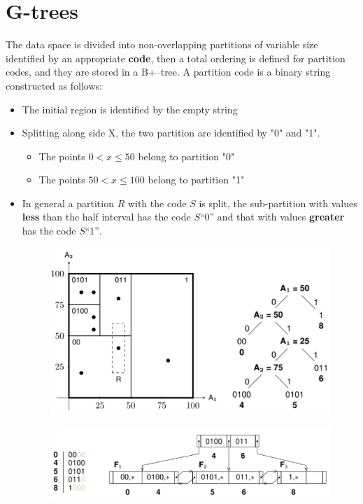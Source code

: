 \section{G-trees}
The data space is divided into non-overlapping partitions of variable size identified by an appropriate \textbf{code}, then a total ordering is defined for partition codes, and they are stored in a B+–tree. A partition code is a binary string constructed as follows:
\begin{itemize}
    \item The initial region is identified by the empty string
    \item Splitting along side X, the two partition are identified by "0" and "1". 
    \begin{itemize}
        \item The points $0 < x \leq 50$ belong to partition "0"
        \item The points $50 < x \leq 100$ belong to partition "1"
    \end{itemize}
    \item In general a partition $R$ with the code $S$ is split, the sub-partition with values \textbf{less} than the half interval has the code $S“0”$ and that with values \textbf{greater} has the code $S“1”$.

    \newpage
    \begin{figure}[h]
         \centering
         \includegraphics[width=.5\linewidth]{images/DBMS_Internals/MultiDimensionalDataOrganizations/G-tree1.jpeg}
    \end{figure}

    \begin{figure}[h]
         \centering
         \includegraphics[width=.8\linewidth]{images/DBMS_Internals/MultiDimensionalDataOrganizations/G-tree2.jpeg}
    \end{figure}
    
\end{itemize}

